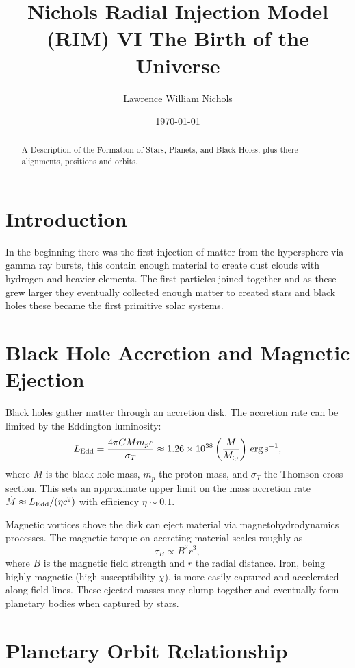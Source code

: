 \documentclass[12pt]{article}
\title{Nichols Radial Injection Model (RIM) VI The Birth of the Universe}
\author{Lawrence William Nichols}
\date{\today}
\begin{document}
\maketitle

\begin{abstract}
A Description of the Formation of Stars, Planets, and Black Holes, plus there alignments, positions and orbits.
\end{abstract}

\section{Introduction}
In the beginning there was the first injection of matter from the hypersphere via gamma ray bursts, this contain enough material to create dust clouds with hydrogen and heavier elements. The first
particles joined together and as these grew larger they eventually collected enough matter to created stars and black holes these became the first primitive solar systems. 

\section{Black Hole Accretion and Magnetic Ejection}

Black holes gather matter through an accretion disk. The accretion rate can be limited by the Eddington luminosity:
\begin{equation}
    L_{\rm Edd} = \frac{4\pi G M m_p c}{\sigma_T} \approx 1.26 \times 10^{38} \left( \frac{M}{M_\odot} \right) \, \rm erg\,s^{-1},
\end{equation}
where $M$ is the black hole mass, $m_p$ the proton mass, and $\sigma_T$ the Thomson cross-section. This sets an approximate upper limit on the mass accretion rate $\dot{M} \approx L_{\rm Edd}/(\eta c^2)$ with efficiency $\eta \sim 0.1$.

Magnetic vortices above the disk can eject material via magnetohydrodynamics processes. The magnetic torque on accreting material scales roughly as
\begin{equation}
    \tau_B \propto B^2 r^3,
\end{equation}
where $B$ is the magnetic field strength and $r$ the radial distance. Iron, being highly magnetic (high susceptibility $\chi$), is more easily captured and accelerated along field lines. These ejected masses may clump together and eventually form planetary bodies when captured by stars.

\section{Planetary Orbit Relationship}
\end{document}
